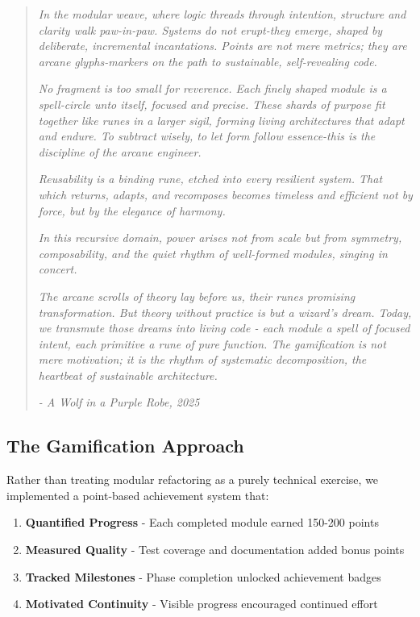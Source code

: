 \documentclass[11pt]{article}
\begin{document}
\begin{quote}
  \emph{In the modular weave, where logic threads through intention, structure and clarity walk paw-in-paw. Systems do not erupt-they emerge, shaped by deliberate, incremental incantations. Points are not mere metrics; they are arcane glyphs-markers on the path to sustainable, self-revealing code.}
  
  \emph{No fragment is too small for reverence. Each finely shaped module is a spell-circle unto itself, focused and precise. These shards of purpose fit together like runes in a larger sigil, forming living architectures that adapt and endure. To subtract wisely, to let form follow essence-this is the discipline of the arcane engineer.}
  
  \emph{Reusability is a binding rune, etched into every resilient system. That which returns, adapts, and recomposes becomes timeless and efficient not by force, but by the elegance of harmony.}
  
  \emph{In this recursive domain, power arises not from scale but from symmetry, composability, and the quiet rhythm of well-formed modules, singing in concert.}
  
  \emph{The arcane scrolls of theory lay before us, their runes promising transformation. But theory without practice is but a wizard's dream. Today, we transmute those dreams into living code - each module a spell of focused intent, each primitive a rune of pure function. The gamification is not mere motivation; it is the rhythm of systematic decomposition, the heartbeat of sustainable architecture.}

  \emph{- A Wolf in a Purple Robe, 2025}
\end{quote}

\subsection{The Gamification Approach}

Rather than treating modular refactoring as a purely technical exercise, we implemented a point-based achievement system that:

\begin{enumerate}
\item \textbf{Quantified Progress} - Each completed module earned 150-200 points
\item \textbf{Measured Quality} - Test coverage and documentation added bonus points
\item \textbf{Tracked Milestones} - Phase completion unlocked achievement badges
\item \textbf{Motivated Continuity} - Visible progress encouraged continued effort
\end{enumerate}
\end{document}

